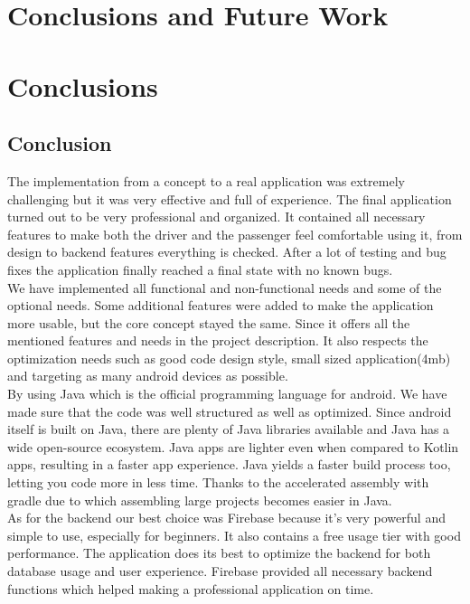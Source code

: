 \chapter{Conclusions and Future Work}\label{chap:conclusions}
\chapter{Conclusions}\label{chap:conclusions}

\section{Conclusion}
The implementation from a concept to a real application was extremely challenging but it was very effective and full of experience. The final application turned out to be very professional and organized. It contained all necessary features to make both the driver and the passenger feel comfortable using it, from design to backend features everything is checked. After a lot of testing and bug fixes the application finally reached a final state with no known bugs.\\

We have implemented all functional and non-functional needs and some of the optional needs. Some additional features were added to make the application more usable, but the core concept stayed the same. Since it offers all the mentioned features and needs in the project description. It also respects the optimization needs such as good code design style, small sized application(4mb) and targeting as many android devices as possible.\\

By using Java which is the official programming language for android. We have made sure that the code was well structured as well as optimized. Since android itself is built on Java, there are plenty of Java libraries available and Java has a wide open-source ecosystem. Java apps are lighter even when compared to Kotlin apps, resulting in a faster app experience. Java yields a faster build process too, letting you code more in less time. Thanks to the accelerated assembly with gradle due to which assembling large projects becomes easier in Java.\\

As for the backend our best choice was Firebase because it’s very powerful and simple to use, especially for beginners. It also contains a free usage tier with good performance. The application does its best to optimize the backend for both database usage and user experience. Firebase provided all necessary backend functions which helped making a professional application on time.\\
 
